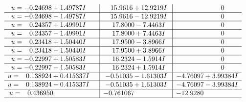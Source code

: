 \documentclass[1p]{elsarticle_modified}
\theoremstyle{definition}
\begin{document}
$$\begin{array}{c|c|c}
\begin{aligned}
u &= -0.24698 + 1.49787 I\end{aligned}
 & \phantom{-}15.9616 + 12.9219 I & \phantom{-0.000000 } 0 \\ \hline\begin{aligned}
u &= -0.24698 - 1.49787 I\end{aligned}
 & \phantom{-}15.9616 - 12.9219 I & \phantom{-0.000000 } 0 \\ \hline\begin{aligned}
u &= \phantom{-}0.24357 + 1.49991 I\end{aligned}
 & \phantom{-}17.8000 - 7.4463 I & \phantom{-0.000000 } 0 \\ \hline\begin{aligned}
u &= \phantom{-}0.24357 - 1.49991 I\end{aligned}
 & \phantom{-}17.8000 + 7.4463 I & \phantom{-0.000000 } 0 \\ \hline\begin{aligned}
u &= \phantom{-}0.23418 + 1.50440 I\end{aligned}
 & \phantom{-}17.9500 - 3.8966 I & \phantom{-0.000000 } 0 \\ \hline\begin{aligned}
u &= \phantom{-}0.23418 - 1.50440 I\end{aligned}
 & \phantom{-}17.9500 + 3.8966 I & \phantom{-0.000000 } 0 \\ \hline\begin{aligned}
u &= -0.22997 + 1.50583 I\end{aligned}
 & \phantom{-}16.2324 - 1.5914 I & \phantom{-0.000000 } 0 \\ \hline\begin{aligned}
u &= -0.22997 - 1.50583 I\end{aligned}
 & \phantom{-}16.2324 + 1.5914 I & \phantom{-0.000000 } 0 \\ \hline\begin{aligned}
u &= \phantom{-}0.138924 + 0.415337 I\end{aligned}
 & -0.51035 - 1.61303 I & -4.76097 + 3.99384 I \\ \hline\begin{aligned}
u &= \phantom{-}0.138924 - 0.415337 I\end{aligned}
 & -0.51035 + 1.61303 I & -4.76097 - 3.99384 I \\ \hline\begin{aligned}
u &= \phantom{-}0.436950\phantom{ +0.000000I}\end{aligned}
 & -0.761067\phantom{ +0.000000I} & -12.9280\phantom{ +0.000000I}\\
 \hline 
 \end{array}$$\newpage
\end{document}
